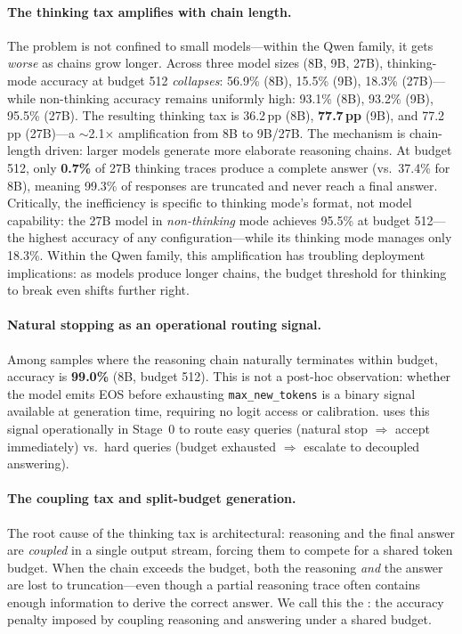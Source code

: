 \paragraph{The thinking tax amplifies with chain length.}
The problem is not confined to small models---within the Qwen family, it gets \emph{worse} as chains grow longer.
Across three model sizes (8B, 9B, 27B), thinking-mode accuracy at budget 512 \emph{collapses}: 56.9\% (8B), 15.5\% (9B), 18.3\% (27B)---while non-thinking accuracy remains uniformly high: 93.1\% (8B), 93.2\% (9B), 95.5\% (27B).
The resulting thinking tax is 36.2\,pp (8B), \textbf{77.7\,pp} (9B), and 77.2\,pp (27B)---a ${\sim}$2.1$\times$ amplification from 8B to 9B/27B.
The mechanism is chain-length driven: larger models generate more elaborate reasoning chains.
At budget 512, only \textbf{0.7\%} of 27B thinking traces produce a complete answer (vs.\ 37.4\% for 8B), meaning 99.3\% of responses are truncated and never reach a final answer.
Critically, the inefficiency is specific to thinking mode's format, not model capability: the 27B model in \emph{non-thinking} mode achieves 95.5\% at budget 512---the highest accuracy of any configuration---while its thinking mode manages only 18.3\%.
Within the Qwen family, this amplification has troubling deployment implications: as models produce longer chains, the budget threshold for thinking to break even shifts further right.

\paragraph{Natural stopping as an operational routing signal.}
Among samples where the reasoning chain naturally terminates within budget, accuracy is \textbf{99.0\%} (8B, budget 512).
This is not a post-hoc observation: whether the model emits EOS before exhausting \texttt{max\_new\_tokens} is a binary signal available at generation time, requiring no logit access or calibration.
\method{} uses this signal operationally in Stage~0 to route easy queries (natural stop $\Rightarrow$ accept immediately) vs.\ hard queries (budget exhausted $\Rightarrow$ escalate to decoupled answering).

\paragraph{The coupling tax and split-budget generation.}
The root cause of the thinking tax is architectural: reasoning and the final answer are \emph{coupled} in a single output stream, forcing them to compete for a shared token budget.
When the chain exceeds the budget, both the reasoning \emph{and} the answer are lost to truncation---even though a partial reasoning trace often contains enough information to derive the correct answer.
We call this the \couplingtax{}: the accuracy penalty imposed by coupling reasoning and answering under a shared budget.

